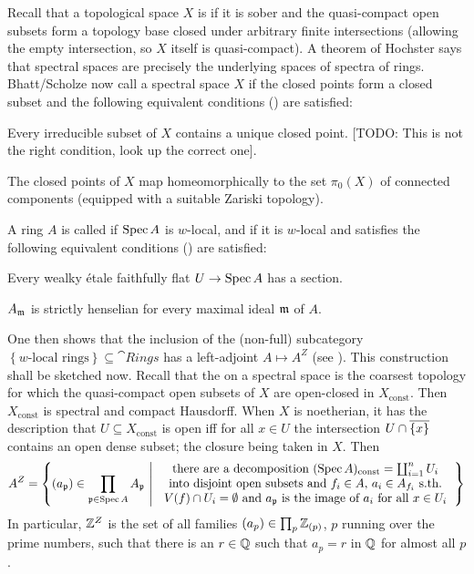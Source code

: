 \documentclass[a4paper, 10pt, oneside, DIV=9, chapterprefix=true, numbers=enddot, bibliography=totoc]{scrbook}
\begin{document}
Recall that a topological space $X$ is  if it is sober and the quasi-compact open subsets form a topology base closed under arbitrary finite intersections (allowing the empty intersection, so $X$ itself is quasi-compact). A theorem of Hochster says that  spectral spaces are precisely the underlying spaces of spectra of rings. Bhatt/Scholze now call a spectral space $X$  if the closed points form a closed subset and the following equivalent conditions (\cite[Lemma~2.1.4]{proetale}) are satisfied:
\begin{alphanumerate}
	\item Every irreducible subset of $X$ contains a unique closed point. [TODO: This is not the right condition, look up the correct one].
	\item The closed points of $X$ map homeomorphically to the set $\pi_0(X)$ of connected components (equipped with a suitable Zariski topology).
\end{alphanumerate}
A ring $A$ is called  if $\operatorname{Spec} A$ is $w$-local, and  if it is $w$-local and satisfies the following equivalent conditions (\cite[Definition~2.2.1 and Lemma~2.2.9]{proetale}) are satisfied:
\begin{numerate}
	\item Every wealky étale faithfully flat $U\morphism \Spec A$ has a section.
	\item $A_{\mathfrak{m}}$ is strictly henselian for every maximal ideal $\mathfrak{m}$ of $A$.
\end{numerate}
One then shows that the inclusion of the (non-full) subcategory $\left\{w\text{-local rings}\right\}\subseteq\cat{Rings}$ has a left-adjoint $A\mapsto A^Z$ (see \cite[Lemma~2.2.4]{proetale}). This construction shall be sketched now. Recall that the  on a spectral space is the coarsest topology for which the quasi-compact open subsets of $X$ are open-closed in $X_\mathrm{const}$. Then $X_\mathrm{const}$ is spectral and compact Hausdorff. When $X$ is noetherian, it has the description that $U\subseteq X_\mathrm{const}$ is open iff for all $x\in U$ the intersection $U\cap \ov{\{x\}}$ contains an open dense subset; the closure being taken in $X$. Then
\begin{equation*}
	A^Z=\left\{(a_\pp)\in\prod_{\pp\in\Spec A}A_\pp\st \begin{tabular}{c}
	there are a decomposition $(\Spec A)_\mathrm{const}=\coprod_{i=1}^nU_i$\\
	into disjoint open subsets and $f_i\in A$, $a_i\in A_{f_i}$ s.th.\\
	$V(f)\cap U_i=\emptyset$ and $a_\pp$ is the image of $a_i$ for all $x\in U_i$
	\end{tabular}\right\}
\end{equation*}
In particular, $\mathbb{Z}^Z$ is the set of all families $(a_p)\in\prod_p\mathbb{Z}_{(p)}$, $p$ running over the prime numbers, such that there is an $r\in \mathbb{Q}$ such that $a_p=r$ in $\mathbb{Q}$ for almost all $p$.

\appendix



\backmatter{}
\printbibliography[prenote=LINKS]
\end{document}
